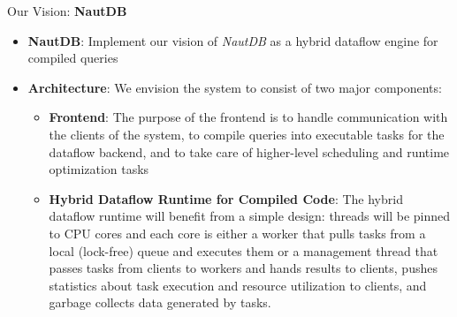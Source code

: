 \begin{block}{Our Vision: \textbf{NautDB}}
  \begin{itemize}
  \item \textbf{NautDB}: Implement our vision of \textit{NautDB} as a
    hybrid dataflow engine for compiled queries
  \item \textbf{Architecture}: We envision the system to consist of two major components:
    \begin{itemize}
    \item \textbf{Frontend}: The purpose of the frontend is to handle communication with the clients of the system, to compile queries into executable tasks for the dataflow backend, and to take care of higher-level scheduling and runtime optimization tasks
    \item \textbf{Hybrid Dataflow Runtime for Compiled Code}: The hybrid dataflow runtime will benefit from a simple design: threads will be pinned to CPU cores and each core is either a worker that pulls tasks from a local (lock-free) queue and executes them or a management thread that passes tasks from clients to workers and hands results to clients, pushes statistics about task execution and resource utilization to clients, and garbage collects data generated by tasks.
    \end{itemize}
  \end{itemize}
\end{block}



